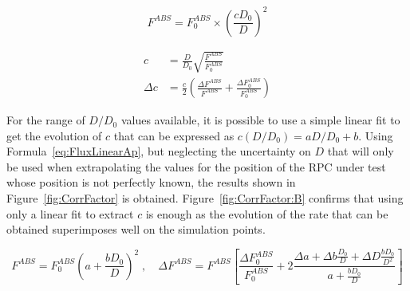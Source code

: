 	\begin{minipage}{.49\linewidth}
	\begin{equation}
	\label{eq:Flux}
	F^{ABS} = F_0^{ABS} \times \left( \frac{c D_0}{D} \right)^2
	\end{equation}
	\end{minipage}
	\hfill
	\begin{minipage}{.49\linewidth}
	\begin{equation}
	\label{eq:Factor}
		\begin{aligned}
		c &= \frac{D}{D_0}\sqrt{\frac{F^{ABS}}{F_0^{ABS}}}\\
		\Delta c &= \frac{c}{2}\left(\frac{\Delta F^{ABS}}{F^{ABS}}+\frac{\Delta F^{ABS}_0}{F^{ABS}_0}\right)
		\end{aligned}
	\end{equation}
	\end{minipage}
	\vspace{5mm}
	
	For the range of $D/D_0$ values available, it is possible to use a simple linear fit to get the evolution of $c$ that can be expressed as $c(D/D_0)=aD/D_0+b$. Using Formula~\ref{eq:FluxLinearAp}, but neglecting the uncertainty on $D$ that will only be used when extrapolating the values for the position of the RPC under test whose position is not perfectly known, the results shown in Figure~\ref{fig:CorrFactor} is obtained. Figure~\ref{fig:CorrFactor:B} confirms that using only a linear fit to extract $c$ is enough as the evolution of the rate that can be obtained superimposes well on the simulation points.
	
	\begin{equation}
	\label{eq:FluxLinearAp}
	F^{ABS} = F^{ABS}_0 \left( a + \frac{bD_0}{D} \right)^2 \; , \quad \Delta F^{ABS} = F^{ABS} \left[\frac{\Delta F^{ABS}_0}{F^{ABS}_0} + 2\frac{\Delta a + \Delta b\frac{D_0}{D} + \Delta D\frac{bD_0}{D^2}}{a + \frac{bD_0}{D}}\right]
	\end{equation}
	
